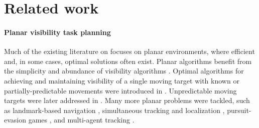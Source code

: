 \section{Related work}
\label{sec:related:work}


\paragraph*{Planar visibility task planning}
Much of the existing literature on \vistamp focuses on planar environments, where efficient and, in some cases, optimal solutions often exist. Planar \vistamp algorithms benefit from the simplicity and abundance of visibility algorithms \cite{g-vap-07}. Optimal algorithms for achieving and maintaining visibility of a single moving target with known or partially-predictable movements were introduced in \cite{lgbl-msmvmt-97}. Unpredictable moving targets were later addressed in \cite{MCTH-sbmpamvut-05}. Many more planar \vistamp problems were tackled, such as landmark-based navigation \cite{bmh-oplbnddvfvc-07}, simultaneous tracking and localization \cite{wlzhlf-ovmpfttl-14}, pursuit-evasion games \cite{bh-enetppegvc-08}, and multi-agent tracking \cite{rl-mrtdtts-16}.

